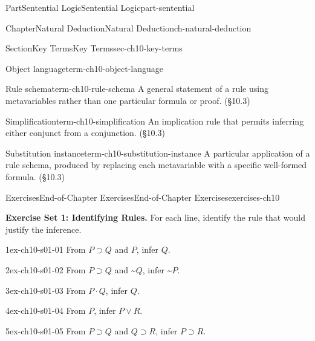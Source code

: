 \documentclass[oneside,10pt,]{book}
\begin{document}
\begin{partptx}{Part}{Sentential Logic}{}{Sentential Logic}{}{}{part-sentential}
\begin{chapterptx}{Chapter}{Natural Deduction}{}{Natural Deduction}{}{}{ch-natural-deduction}
\begin{sectionptx}{Section}{Key Terms}{}{Key Terms}{}{}{sec-ch10-key-terms}
\begin{descriptionlist}
\begin{dlimedium}{Object language}{term-ch10-object-language}
\end{dlimedium}%
\begin{dlimedium}{Rule schema}{term-ch10-rule-schema}%
A general statement of a rule using metavariables rather than one particular formula or proof. (§10.3)%
\end{dlimedium}%
\begin{dlimedium}{Simplification}{term-ch10-simplification}%
An implication rule that permits inferring either conjunct from a conjunction. (§10.3)%
\end{dlimedium}%
\begin{dlimedium}{Substitution instance}{term-ch10-substitution-instance}%
A particular application of a rule schema, produced by replacing each metavariable with a specific well-formed formula. (§10.3)%
\end{dlimedium}%
\end{descriptionlist}
\end{sectionptx}
%
%
\typeout{************************************************}
\typeout{************************************************}
%
\begin{exercises-section}{Exercises}{End-of-Chapter Exercises}{}{End-of-Chapter Exercises}{}{}{exercises-ch10}
\par\medskip\noindent%
\textbf{Exercise Set 1: Identifying Rules.}\space\space\hypertarget{exgroup-ch10-s01}{}%
For each line, identify the rule that would justify the inference.%
\begin{exercisegroup}
\begin{divisionexerciseeg}{1}{}{}{ex-ch10-s01-01}%
From \(P \supset Q\) and \(P\), infer \(Q\).%
\end{divisionexerciseeg}%
\begin{divisionexerciseeg}{2}{}{}{ex-ch10-s01-02}%
From \(P \supset Q\) and \({\text{\textasciitilde}}Q\), infer \({\text{\textasciitilde}}P\).%
\end{divisionexerciseeg}%
\begin{divisionexerciseeg}{3}{}{}{ex-ch10-s01-03}%
From \(P \cdot Q\), infer \(Q\).%
\end{divisionexerciseeg}%
\begin{divisionexerciseeg}{4}{}{}{ex-ch10-s01-04}%
From \(P\), infer \(P \lor R\).%
\end{divisionexerciseeg}%
\begin{divisionexerciseeg}{5}{}{}{ex-ch10-s01-05}%
From \(P \supset Q\) and \(Q \supset R\), infer \(P \supset R\).%
\end{divisionexerciseeg}%

\end{exercisegroup}
\end{exercises-section}
\end{chapterptx}
\end{partptx}
\end{document}
